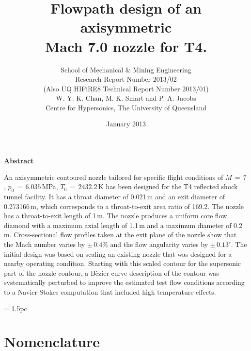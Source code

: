 \documentclass[12pt,a4paper]{article}
\title{
    Flowpath design of an axisymmetric \\Mach 7.0 nozzle for T4.
}
\author{
    School of Mechanical \& Mining Engineering \\
    Research Report Number 2013/02 \\   \vspace{3mm} 
    (Also UQ HIFiRE8 Technical Report Number 2013/01) \\
    W. Y. K. Chan, M. K. Smart and P. A. Jacobs \\
    Centre for Hypersonics, The University of Queensland 
}
\date{January 2013}
\begin{document}
\maketitle

\centerline{\textbf{Abstract}}
\medskip
An axisymmetric contoured nozzle tailored for specific flight conditions
of $M\,=\,7$, $p_0\,=\,6.035$\,MPa, $T_0\,=\,2432.2$\,K has been designed 
for the T4 reflected shock tunnel facility. It has a throat diameter of 
0.021\,m and an exit diameter of 0.273166\,m, which corresponds to a 
throat-to-exit area ratio of 169.2. The nozzle has a throat-to-exit length 
of 1\,m. The nozzle produces a uniform core flow diamond with a maximum 
axial length of 1.1\,m and a maximum diameter of 0.2\,m. Cross-sectional 
flow profiles taken at the exit plane of the nozzle show that the Mach number
varies by $\pm\,0.4$\% and the flow angularity varies by $\pm\,0.13^{\circ}$.
\medskip
The initial design was based on scaling an existing nozzle that was designed
for a nearby operating condition. Starting with this scaled contour for the
supersonic part of the nozzle contour, a B\`ezier curve description of the
contour was systematically perturbed to improve the estimated test flow
conditions according to a Navier-Stokes computation that included high
temperature effects.

\newpage
\tableofcontents


\newpage
\baselineskip = 1.5pc


\section*{Nomenclature}
\label{sec:nomenclature}
\end{document}
